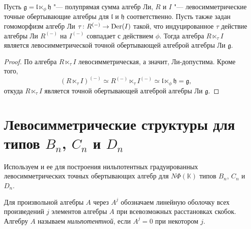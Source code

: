 \documentclass[a4paper,14pt,oneside,openany]{memoir}
\begin{document}
\begin{corollary}\label{corollary:enveloping-semidirect}
    Пусть $\mathfrak{g} = \mathfrak{l}\ltimes_{\phi}\mathfrak{h}$ "--- полупрямая
    сумма алгебр Ли, $R$ и $I$ "--- левосимметрические точные обертывающие алгебры
    для $\mathfrak{l}$ и $\mathfrak{h}$ соответственно. Пусть также задан
    гомоморфизм алгебр Ли $\tau\colon R^{(-)}\to\operatorname{Der}(I)$ такой, что индуцированное
    $\tau$ действие алгебры Ли $R^{(-)}$ на $I^{(-)}$ совпадает с действием $\phi$.
    Тогда алгебра $R\ltimes_{\tau} I$ является левосимметрической точной
    обертывающей алгеброй алгебры Ли $\mathfrak{g}$.
\end{corollary}
\begin{proof}
    По  алгебра $R\ltimes_{\tau}I$
    левосимметрическая, а значит, Ли-допустима. Кроме того,
    \[
        (R\ltimes_{\tau}I)^{(-)}\simeq
        R^{(-)}\ltimes_\tau I^{(-)}\simeq
        \mathfrak{l}\ltimes_{\phi}\mathfrak{h} = \mathfrak{g},
    \]
    откуда $R\ltimes_{\tau}I$ является точной обертывающей алгеброй алгебры Ли
    $\mathfrak{g}$.
\end{proof}

\section{Левосимметрические структуры для типов \texorpdfstring{$B_n$}{Bₙ}, \texorpdfstring{$C_n$}{Cₙ} и \texorpdfstring{$D_n$}{Dₙ}}\label{sec:semidirect-classical}
%
Используем  и ее
 для построения нильпотентных
градуированных левосимметрических точных обертывающих алгебр для
$N\Phi(\mathbb{K})$ типов $B_n$, $C_n$ и $D_n$.

Для произвольной алгебры $A$ через $A^j$ обозначаем линейную оболочку всех
произведений $j$ элементов алгебры $A$ при всевозможных расстановках скобок.
Алгебру $A$ называем \emph{нильпотентной}, если $A^j=0$ при некотором $j$.

\medskip
\end{document}
